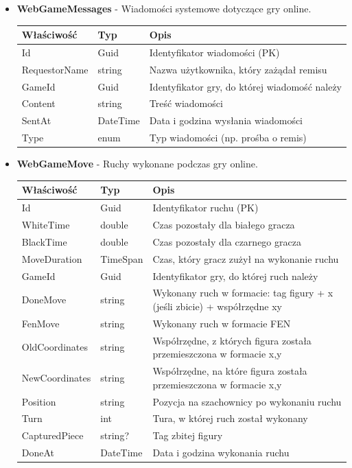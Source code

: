 \documentclass[12pt,a4paper]{article}
\begin{document}
\begin{itemize}
    \item \textbf{WebGameMessages} - Wiadomości systemowe dotyczące gry online.
    \begin{longtable}{|m{4cm}|m{2cm}|m{8cm}|}
        \hline
        \textbf{Właściwość} & \textbf{Typ} & \textbf{Opis} \\ \hline
        \endhead
        \hline
        Id & Guid & Identyfikator wiadomości (PK) \\ \hline
        RequestorName & string & Nazwa użytkownika, który zażądał remisu \\ \hline
        GameId & Guid & Identyfikator gry, do której wiadomość należy \\ \hline
        Content & string & Treść wiadomości \\ \hline
        SentAt & DateTime & Data i godzina wysłania wiadomości \\ \hline
        Type & enum & Typ wiadomości (np. prośba o remis) \\ \hline
    \end{longtable}
        

    \item \textbf{WebGameMove} - Ruchy wykonane podczas gry online.
    \begin{longtable}{|m{4cm}|m{2cm}|m{8cm}|}
        \hline
        \textbf{Właściwość} & \textbf{Typ} & \textbf{Opis} \\ \hline
        \endhead
        \hline
        Id & Guid & Identyfikator ruchu (PK) \\ \hline
        WhiteTime & double & Czas pozostały dla białego gracza \\ \hline
        BlackTime & double & Czas pozostały dla czarnego gracza \\ \hline
        MoveDuration & TimeSpan & Czas, który gracz zużył na wykonanie ruchu \\ \hline
        GameId & Guid & Identyfikator gry, do której ruch należy \\ \hline
        DoneMove & string & Wykonany ruch w formacie: tag figury + x (jeśli zbicie) + współrzędne xy \\ \hline
        FenMove & string & Wykonany ruch w formacie FEN \\ \hline
        OldCoordinates & string & Współrzędne, z których figura została przemieszczona w formacie x,y \\ \hline
        NewCoordinates & string & Współrzędne, na które figura została przemieszczona w formacie x,y \\ \hline
        Position & string & Pozycja na szachownicy po wykonaniu ruchu \\ \hline
        Turn & int & Tura, w której ruch został wykonany \\ \hline
        CapturedPiece & string? & Tag zbitej figury \\ \hline
        DoneAt & DateTime & Data i godzina wykonania ruchu \\ \hline
    \end{longtable}
        

\end{itemize}
\end{document}
